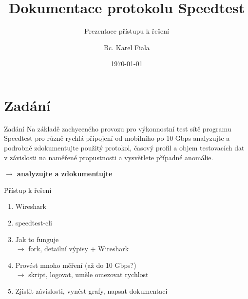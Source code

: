\documentclass{beamer}
\title[Dokumentace protokolu Speedtest]{Dokumentace protokolu Speedtest}
\subtitle[Prezentace přístupu k řešení]{Prezentace přístupu k řešení}
\author[Bc. Karel Fiala]{Bc. Karel Fiala}
\institute[ČVUT FIT]{
   Fakulta informačních technologií \\
   České vysoké učení technické v~Praze
 }
\date{\today}
\begin{document}
\begin{frame}
   \titlepage
\end{frame}




\section{Zadání}
\begin{frame}{Zadání}
Na základě zachyceného provozu pro výkonnostní test sítě programu Speedtest pro různě rychlá připojení od mobilního po 10 Gbps analyzujte a podrobně zdokumentujte použitý protokol, časový profil a objem testovacích dat v závislosti na naměřené propustnosti a vysvětlete případné anomálie.

\bigskip

\hfill \textbf{$\rightarrow$ analyzujte a zdokumentujte} \hfill \hfill 

\end{frame}


\begin{frame}{Přístup k řešení}
\begin{enumerate}
\item Wireshark
\bigskip
\item speedtest-cli
\bigskip
\item Jak to funguje\\ $\rightarrow$ fork, detailní výpisy + Wireshark
\bigskip
\item Provést mnoho měření (až do 10 Gbps?)\\ $\rightarrow$ skript, logovat, uměle omezovat rychlost
\bigskip
\item Zjistit závislosti, vynést grafy, napsat dokumentaci
\end{enumerate}

\end{frame}


\end{document}
